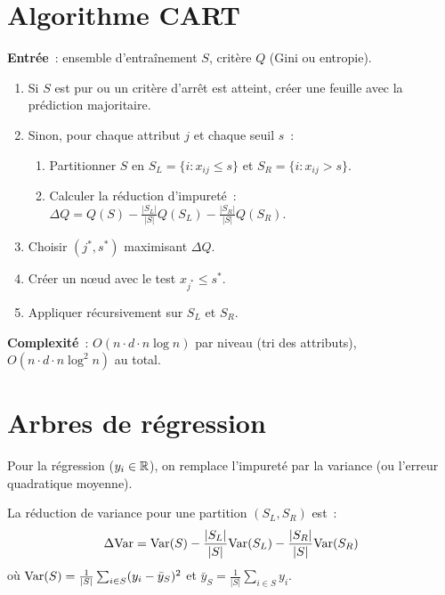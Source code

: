 \section{Algorithme CART}
\label{sec:cart}

\begin{algorithme}[title=\textbf{Construction d'un arbre CART}]
\textbf{Entr\'ee}~: ensemble d'entra\^inement $S$, crit\`ere $Q$ (Gini ou
entropie).

\begin{enumerate}
  \item Si $S$ est pur ou un crit\`ere d'arr\^et est atteint, cr\'eer une
    feuille avec la pr\'ediction majoritaire.
  \item Sinon, pour chaque attribut $j$ et chaque seuil $s$~:
    \begin{enumerate}
      \item Partitionner $S$ en $S_L = \{i : x_{ij} \leq s\}$ et
        $S_R = \{i : x_{ij} > s\}$.
      \item Calculer la r\'eduction d'impuret\'e~:
        $\Delta Q = Q(S) - \frac{|S_L|}{|S|}Q(S_L) - \frac{|S_R|}{|S|}Q(S_R)$.
    \end{enumerate}
  \item Choisir $(j^*, s^*)$ maximisant $\Delta Q$.
  \item Cr\'eer un n\oe{}ud avec le test $x_{j^*} \leq s^*$.
  \item Appliquer r\'ecursivement sur $S_L$ et $S_R$.
\end{enumerate}
\textbf{Complexit\'e}~: $O(n \cdot d \cdot n \log n)$ par niveau (tri des
attributs), $O(n \cdot d \cdot n \log^2 n)$ au total.
\end{algorithme}

\section{Arbres de r\'egression}
\label{sec:regression-trees}

Pour la r\'egression ($y_i \in \mathbb{R}$), on remplace l'impuret\'e par la variance
(ou l'erreur quadratique moyenne).

\begin{definition}
La r\'eduction de variance pour une partition $(S_L, S_R)$ est~:
\begin{equation}
  \Delta \text{Var} = \mathrm{Var}(S) - \frac{|S_L|}{|S|}\mathrm{Var}(S_L)
  - \frac{|S_R|}{|S|}\mathrm{Var}(S_R)
\end{equation}
o\`u $\mathrm{Var}(S) = \frac{1}{|S|}\sum_{i \in S}(y_i - \bar{y}_S)^2$ et
$\bar{y}_S = \frac{1}{|S|}\sum_{i \in S} y_i$.
\end{definition}


